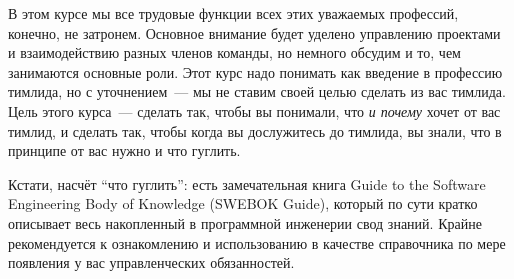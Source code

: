 \documentclass{../../text-style}
\begin{document}
В этом курсе мы все трудовые функции всех этих уважаемых профессий, конечно, не затронем. Основное внимание будет уделено управлению проектами и взаимодействию разных членов команды, но немного обсудим и то, чем занимаются основные роли. Этот курс надо понимать как введение в профессию тимлида, но с уточнением~--- мы не ставим своей целью сделать из вас тимлида. Цель этого курса~--- сделать так, чтобы вы понимали, что \emph{и почему} хочет от вас тимлид, и сделать так, чтобы когда вы дослужитесь до тимлида, вы знали, что в принципе от вас нужно и что гуглить.

Кстати, насчёт \enquote{что гуглить}: есть замечательная книга Guide to the Software Engineering Body of Knowledge (SWEBOK Guide), который по сути кратко описывает весь накопленный в программной инженерии свод знаний. Крайне рекомендуется к ознакомлению и использованию в качестве справочника по мере появления у вас управленческих обязанностей.
\end{document}
